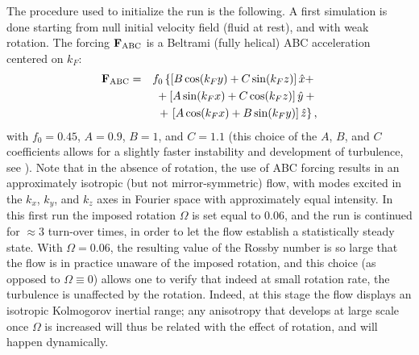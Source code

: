 \documentclass[aps,amsmath,amssymb,floatfix,showpacs]{revtex4}
\begin{document}
The procedure used to initialize the run is the following. A first simulation is done starting from null initial velocity field (fluid at rest), and with weak rotation. The forcing ${\bf F}_{\rm ABC}$ is a Beltrami (fully helical) ABC acceleration centered on $k_F$:
{\setlength\arraycolsep{2pt}
\begin{eqnarray}
{\bf F}_{\rm ABC} &=& f_0 \left\{ \left[B \cos(k_F y) + 
    C \sin(k_F z) \right] \hat{x} + \right. {} \nonumber \\
&& {} + \left[A \sin(k_F x) + C \cos(k_F z) \right] \hat{y} + 
   {} \nonumber \\
&& {} + \left. \left[A \cos(k_F x) + B \sin(k_F y) \right] 
   \hat{z} \right\},
\label{eq:ABC}
\end{eqnarray}}
with $f_0=0.45$, $A=0.9$, $B=1$, and $C=1.1$ (this choice of the $A$, $B$, and $C$ coefficients allows for a slightly faster instability and development of turbulence, see \citealt{Archontis03}). {Note that in the absence of rotation, the use of ABC forcing results in an approximately isotropic (but not mirror-symmetric) flow, with modes excited in the $k_x$, $k_y$, and $k_z$ axes in Fourier space with approximately equal intensity.} In this first run the imposed rotation $\Omega$ is set equal to $0.06$, and the run is continued for $\approx 3$ turn-over times, in order to let the flow establish a statistically steady state. With $\Omega=0.06$, the resulting value of the Rossby number is so large that the flow is in practice unaware of the imposed rotation, and this choice (as opposed to $\Omega\equiv 0$) allows one to verify that indeed at small rotation rate, the turbulence is unaffected by the rotation. Indeed, at this stage the flow displays an isotropic Kolmogorov inertial range; any anisotropy that develops at large scale once $\Omega$ is increased will thus be related with the effect of rotation, and will happen dynamically.
\end{document}
